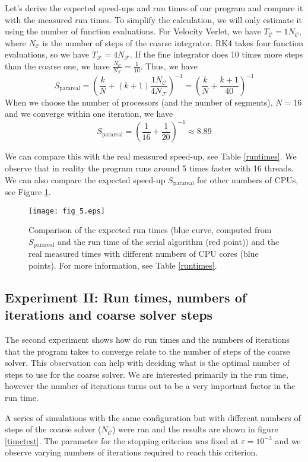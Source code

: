 \documentclass[conference]{IEEEtran}
\begin{document}
Let's derive the expected speed-ups and run times of our program and compare it with the measured run times. To simplify the calculation, we will only estimate it using the number of function evaluations. For Velocity Verlet, we have $T_\mathcal{C} = 1N_\mathcal{C}$, where $N_\mathcal{C}$ is the number of steps of the coarse integrator. RK4 takes four function evaluations, so we have $T_\mathcal{F} = 4N_\mathcal{F}$. If the fine integrator does 10 times more steps than the coarse one, we have $\frac{N_\mathcal{C}}{N_\mathcal{F}} = \frac{1}{10}$. Thus, we have
$$
S_\text{parareal} = \left(\frac{k}{N} + (k+1)\frac{1N_\mathcal{C}}{4N_\mathcal{F}}\right)^{-1} = \left(\frac{k}{N} + \frac{k+1}{40}\right)^{-1}
$$
When we choose the number of processors (and the number of segments), $N = 16$ and we converge within one iteration, we have
$$
S_\text{parareal} = \left(\frac{1}{16} + \frac{1}{20}\right)^{-1} \approx 8.89
$$

We can compare this with the real measured speed-up, see Table \ref{runtimes}. We observe that in reality the program runs around 5 times faster with 16 threads. We can also compare the expected speed-up $S_\text{parareal}$ for other numbers of CPUs, see Figure \ref{speeds}.

\begin{figure}[htbp]
\centerline{\texttt{[image: fig\_5.eps]}}
\caption{Comparison of the expected run times (blue curve, computed from $S_\text{parareal}$ and the run time of the serial algorithm (red point)) and the real measured times with different numbers of CPU cores (blue points). For more information, see Table \ref{runtimes}.}
\label{speeds}
\end{figure}

\subsection{Experiment II: Run times, numbers of iterations and coarse solver steps}

The second experiment shows how do run times and the numbers of iterations that the program takes to converge relate to the number of steps of the coarse solver. This observation can help with deciding what is the optimal number of steps to use for the coarse solver. We are interested primarily in the run time, however the number of iterations turns out to be a very important factor in the run time.

A series of simulations with the same configuration but with different numbers of steps of the coarse solver ($N_\mathcal{C}$) were ran and the results are shown in figure \ref{timetest}. The parameter for the stopping criterion was fixed at $\varepsilon = 10^{-3}$ and we observe varying numbers of iterations required to reach this criterion.
\end{document}
